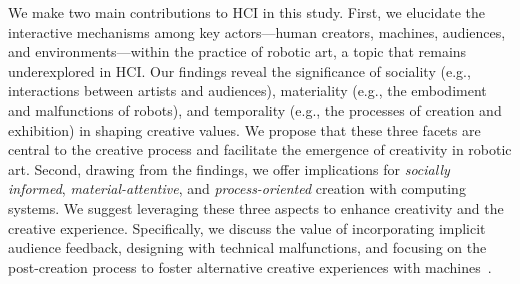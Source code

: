 We make two main contributions to HCI in this study. 
First, we elucidate the interactive mechanisms among key actors---human creators, machines, audiences, and environments---within the practice of robotic art, a topic that remains underexplored in HCI. Our findings reveal the significance of sociality (e.g., interactions between artists and audiences), materiality (e.g., the embodiment and malfunctions of robots), and temporality (e.g., the processes of creation and exhibition) in shaping creative values. We propose that these three facets are central to the creative process and facilitate the emergence of creativity in robotic art.
Second, drawing from the findings, we offer implications for \textit{socially informed}, \textit{material-attentive}, and \textit{process-oriented} creation with computing systems. We suggest leveraging these three aspects to enhance creativity and the creative experience. Specifically, we discuss the value of incorporating implicit audience feedback, designing with technical malfunctions, and focusing on the post-creation process to foster alternative creative experiences with machines~\cite{alter2010designing, juarez2022glitch}.


